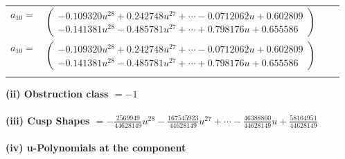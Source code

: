 \documentclass[1p]{elsarticle_modified}
\theoremstyle{definition}
\begin{document}
\begin{tabular}{m{7pt} m{180pt} m{7pt} m{180pt} }
\flushright $a_{10}=$&$\begin{pmatrix}-0.109320 u^{28}+0.242748 u^{27}+\cdots-0.0712062 u+0.602809\\-0.141381 u^{28}-0.485781 u^{27}+\cdots+0.798176 u+0.655586\end{pmatrix}$\\ \flushright $a_{10}=$&$\begin{pmatrix}-0.109320 u^{28}+0.242748 u^{27}+\cdots-0.0712062 u+0.602809\\-0.141381 u^{28}-0.485781 u^{27}+\cdots+0.798176 u+0.655586\end{pmatrix}$\\&\end{tabular}
\flushleft \textbf{(ii) Obstruction class $= -1$}\\~\\
\flushleft \textbf{(iii) Cusp Shapes $= -\frac{2569949}{44628149} u^{28}-\frac{167545923}{44628149} u^{27}+\cdots-\frac{46388860}{44628149} u+\frac{58164951}{44628149}$}\\~\\
\newpage\renewcommand{\arraystretch}{1}
\flushleft \textbf{(iv) u-Polynomials at the component}\newline \\
\end{document}
